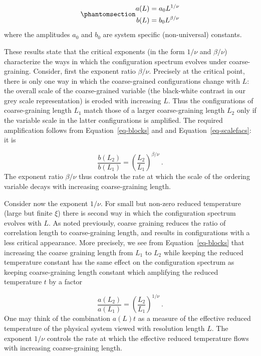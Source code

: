 \documentclass[
  letterpaper,
  enabledeprecatedfontcommands]{report}
\begin{document}
\begin{equation}\phantomsection\label{eq-scalefacs}{
\begin{aligned}
a(L) & =a_0L^{1/\nu} \\
b(L) & =b_0L^{\beta/\nu}
\end{aligned} 
}\end{equation} where the amplitudes \(a_0\) and \(b_0\) are system
specific (non-universal) constants.

These results state that the critical exponents (in the form \(1/\nu\)
and \(\beta/\nu\)) characterize the ways in which the configuration
spectrum evolves under coarse-graining. Consider, first the exponent
ratio \(\beta/\nu\). Precisely at the critical point, there is only one
way in which the coarse-grained configurations change with \(L\): the
overall scale of the coarse-grained variable (the black-white contrast
in our grey scale representation) is eroded with increasing \(L\). Thus
the configurations of coarse-graining length \(L_1\) match those of a
larger coarse-graining length \(L_2\) only if the variable scale in the
latter configurations is amplified. The required amplification follows
from Equation~\ref{eq-blocks} and and Equation~\ref{eq-scalefacs}: it is

\[
\frac{b(L_2)}{b(L_1)}=\left(\frac{L_2}{L_1}\right)^{\beta/\nu}\:.
\] The exponent ratio \(\beta/\nu\) thus controls the rate at which the
scale of the ordering variable decays with increasing coarse-graining
length.

Consider now the exponent \(1/\nu\). For small but non-zero reduced
temperature (large but finite \(\xi\)) there is second way in which the
configuration spectrum evolves with \(L\). As noted previously, coarse
graining reduces the ratio of correlation length to coarse-graining
length, and results in configurations with a less critical appearance.
More precisely, we see from Equation~\ref{eq-blocks} that increasing the
coarse graining length from \(L_1\) to \(L_2\) while keeping the reduced
temperature constant has the same effect on the configuration spectrum
as keeping coarse-graining length constant which amplifying the reduced
temperature \(t\) by a factor

\[
\frac{a(L_2)}{a(L_1)}=\left(\frac{L_2}{L_1}\right)^{1/\nu}\:.
\] One may think of the combination \(a(L)t\) as a measure of the
effective reduced temperature of the physical system viewed with
resolution length \(L\). The exponent \(1/\nu\) controls the rate at
which the effective reduced temperature flows with increasing
coarse-graining length.
\end{document}
